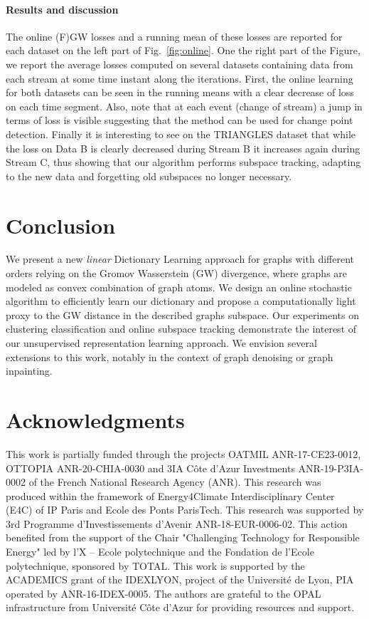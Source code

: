 \documentclass{article}
\begin{document}
	\paragraph{Results and discussion} The online (F)GW losses and a running
	mean of these losses are reported for
	each dataset on the left part of Fig.~\ref{fig:online}. One the right part of the Figure, we
	report the average losses computed on several datasets containing data from each stream at some
	time instant along the iterations. First, the online learning for both datasets
	can be seen in the running means with a clear decrease of loss on each time
	segment. Also,  note that at each event (change of
	stream) a jump in terms of loss is visible suggesting that the method can
	be used for change point detection. Finally it is interesting to see on the
	TRIANGLES dataset that while the loss on Data B is clearly decreased during
	Stream B it increases again during Stream C, thus showing that our algorithm performs subspace tracking, adapting to the new data and forgetting old subspaces no longer necessary.  
	
	\section{Conclusion}
	
	We present a new \emph{linear} Dictionary Learning approach for
	graphs with different orders relying on the Gromov Wasserstein (GW) divergence, where graphs are modeled as convex combination of graph atoms. We design an online stochastic algorithm to efficiently learn our dictionary and propose a computationally light proxy to the GW distance in the described graphs subspace. Our experiments on clustering classification and online subspace tracking demonstrate the interest of our unsupervised representation learning approach. We envision several extensions to this work, notably in the context of
	graph denoising or graph inpainting.
	
	\section*{Acknowledgments}
	This work is partially funded through the projects OATMIL ANR-17-CE23-0012, OTTOPIA ANR-20-CHIA-0030 
	and 3IA C\^{o}te d'Azur Investments ANR-19-P3IA-0002 of the French National Research
	Agency (ANR). This research was produced within the framework of Energy4Climate
	Interdisciplinary Center (E4C) of IP Paris and Ecole des Ponts ParisTech. This
	research was supported by 3rd Programme d'Investissements d'Avenir
	ANR-18-EUR-0006-02. This action benefited from the support of the Chair
	"Challenging Technology for Responsible Energy" led by l'X – Ecole polytechnique
	and the Fondation de l'Ecole polytechnique, sponsored by TOTAL. This work is supported by the ACADEMICS grant of the IDEXLYON, project of the Université de Lyon, PIA operated by ANR-16-IDEX-0005.
	The authors are grateful to the OPAL infrastructure from Universit\'{e} C\^{o}te d'Azur for providing resources and support.
	
\end{document}
